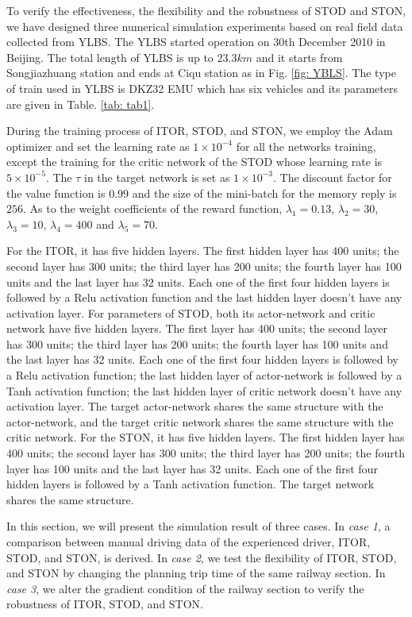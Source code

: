 \documentclass[journal]{IEEEtran}
\begin{document}
To verify the effectiveness, the flexibility and the robustness of STOD and STON, we have designed three numerical simulation experiments based on real field data collected from YLBS. The YLBS started operation on 30th December 2010 in Beijing. The total length of YLBS is up to \(23.3 km\) and it starts from Songjiazhuang station and ends at Ciqu station as in Fig. \ref{fig: YBLS}. The type of train used in YLBS is DKZ32 EMU which has six vehicles and its parameters are given in Table. \ref{tab: tab1}. 

\par During the training process of ITOR, STOD, and STON, we employ the Adam optimizer and set the learning rate as $1 \times 10^{-4}$ for all the networks training, except the training for the critic network of the STOD whose learning rate is $5 \times 10^{-5}$. The $\tau$ in the target network is set as $1 \times 10^{-3}$. The discount factor for the value function is $0.99$ and the size of the mini-batch for the memory reply is $256$. As to the weight coefficients of the reward function, $\lambda_1 = 0.13$, $\lambda_2 = 30$, $\lambda_3 = 10$, $\lambda_4 = 400$ and $\lambda_5 = 70$.

For the ITOR, it has five hidden layers. The first hidden layer has 400 units; the second layer has 300 units; the third layer has 200 units; the fourth layer has 100 units and the last layer has 32 units. Each one of the first four hidden layers is followed by a Relu activation function and the last hidden layer doesn't have any activation layer. For parameters of STOD, both its actor-network and critic network have five hidden layers. The first layer has 400 units; the second layer has 300 units; the third layer has 200 units; the fourth layer has 100 units and the last layer has 32 units. Each one of the first four hidden layers is followed by a Relu activation function; the last hidden layer of actor-network is followed by a Tanh activation function; the last hidden layer of critic network doesn't have any activation layer. The target actor-network shares the same structure with the actor-network, and the target critic network shares the same structure with the critic network. For the STON, it has five hidden layers. The first hidden layer has 400 units; the second layer has 300 units; the third layer has 200 units; the fourth layer has 100 units and the last layer has 32 units. Each one of the first four hidden layers is followed by a Tanh activation function. The target network shares the same structure.

\par In this section, we will present the simulation result of three cases. In \emph{case 1}, a comparison between manual driving data of the experienced driver, ITOR, STOD, and STON, is derived. In \emph{case 2}, we test the flexibility of ITOR, STOD, and STON by changing the planning trip time of the same railway section. In \emph{case 3}, we alter the gradient condition of the railway section to verify the robustness of ITOR, STOD, and STON.
\end{document}
